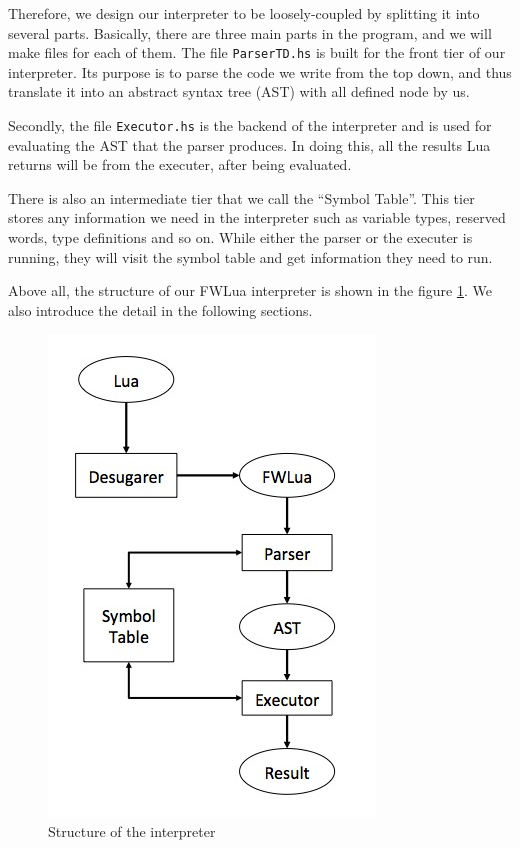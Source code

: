 Therefore, we design our interpreter to be loosely-coupled by splitting it into several parts. Basically, there are three main parts in the program, and we will make files for each of them. The file {\tt ParserTD.hs} is built for the front tier of our interpreter. Its purpose is to parse the code we write from the top down, and thus translate it into an
abstract syntax tree (AST) with all defined node by us. 

Secondly, the file {\tt Executor.hs} is the backend of the interpreter and is used for evaluating the AST that the parser produces. In doing this, all the results Lua returns will be from the executer, after being evaluated. 

There is also an intermediate tier that we call the ``Symbol Table''. This tier stores any information we need in the interpreter such as variable types, reserved words, type definitions and so on. While either the parser or the executer is running, they will visit the symbol table and get information they need to run. 

Above all, the structure of our FWLua interpreter is shown in the figure \ref {fig:structure}. We also introduce the detail in the following sections. 

\begin{figure}
\centering
\caption{Structure of the interpreter}
\label{fig:structure}
\includegraphics[scale = 0.9]{Interpreter}
\end{figure}


